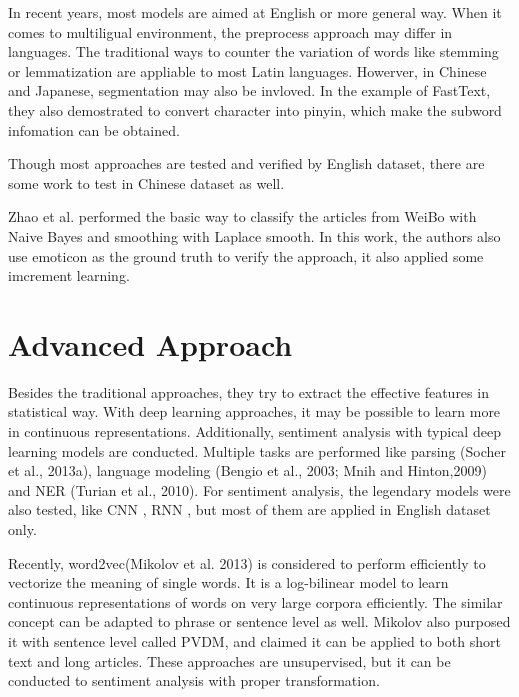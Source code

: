 In recent years, most models are aimed at English or more general way. When it comes to multiligual environment, the preprocess approach may differ in languages. The traditional ways to counter the variation of words like stemming or lemmatization are appliable to most Latin languages.
Howerver, in Chinese and Japanese, segmentation may also be invloved. In the example of FastText\cite{joulin2016fasttext}, they also demostrated to convert character into pinyin, which make the subword infomation can be obtained. 

Though most approaches are tested and verified by English dataset, there are some work to test in Chinese dataset as well.

Zhao et al. \cite{zhao2012moodlens} performed the basic way to classify the articles from WeiBo with Naive Bayes and smoothing with Laplace smooth.  
In this work, the authors also use emoticon as the ground truth to verify the approach, it also applied some imcrement learning. \\


\section{Advanced Approach}

Besides the traditional approaches, they try to extract the effective features in statistical way. 
With deep learning approaches, it may be possible to learn more in continuous representations.
Additionally, sentiment analysis with typical deep learning models are conducted. Multiple tasks are performed like parsing (Socher et al., 2013a), language
modeling (Bengio et al., 2003; Mnih and Hinton,2009) and NER (Turian et al., 2010). For sentiment analysis, the legendary models were also tested, like CNN \cite{kim2014convolutional}, RNN \cite{arevian2007recurrent}, but most of them are applied in English dataset only. 

Recently, word2vec(Mikolov et al. 2013) \cite{word2vec} is considered to perform efficiently to vectorize the meaning of single words. It is a log-bilinear model to learn continuous
representations of words on very large corpora efficiently. The similar concept can be adapted to phrase or sentence level as well.
Mikolov also purposed it with sentence level \cite{PVDM} called PVDM, and claimed it can be applied to both short text and long articles. These approaches are unsupervised, but it can be conducted to sentiment analysis with proper transformation. 

